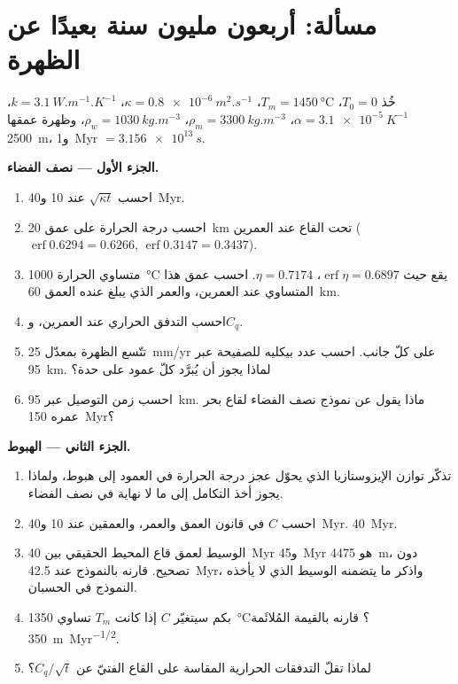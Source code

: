 \section{مسألة: أربعون مليون سنة بعيدًا عن الظهرة}

\begin{problem}
\label{pb:b3:lithosphere-thermal-models:1}
خُذ $T_0 = 0$، $T_m = \qty{1450}{\celsius}$، $\kappa =
\qty{0.8e-6}{m^2.s^{-1}}$، $k = \qty{3.1}{W.m^{-1}.K^{-1}}$، $\alpha =
\qty{3.1e-5}{K^{-1}}$، $\rho_m = \qty{3300}{kg.m^{-3}}$، $\rho_w =
\qty{1030}{kg.m^{-3}}$، وظهرة عمقها \qty{2500}{m}، و\qty{1}{Myr} $=
\qty{3.156e13}{s}$.

\medskip\noindent\textbf{الجزء الأول --- نصف الفضاء.}
\begin{enumerate}
  \item احسب $\sqrt{\kappa t}$ عند 10 و\qty{40}{Myr}.
  \item احسب درجة الحرارة على عمق \qty{20}{km} تحت القاع عند العمرين
        ($\operatorname{erf}0.6294 = 0.6266$, $\operatorname{erf}0.3147 =
        0.3437$).
  \item متساوي الحرارة \qty{1000}{\celsius} يقع حيث $\operatorname{erf}\eta =
        0.6897$، $\eta = 0.7174$. احسب عمق هذا المتساوي عند العمرين، والعمر
        الذي يبلغ عنده العمق \qty{60}{km}.
  \item احسب التدفق الحراري عند العمرين، و$C_q$.
  \item تتّسع الظهرة بمعدّل \qty{25}{mm/yr} على كلّ جانب. احسب عدد بيكليه
        للصفيحة عبر \qty{95}{km}. لماذا يجوز أن يُبرَّد كلّ عمود
        على حدة؟
  \item احسب زمن التوصيل عبر \qty{95}{km}. ماذا يقول عن
        نموذج نصف الفضاء لقاع بحر عمره \qty{150}{Myr}؟
\end{enumerate}

\medskip\noindent\textbf{الجزء الثاني --- الهبوط.}
\begin{enumerate}[resume]
  \item تذكّر توازن الإيزوستازيا الذي يحوّل عجز درجة الحرارة في العمود إلى هبوط،
        ولماذا يجوز أخذ التكامل إلى ما لا نهاية
        في نصف الفضاء.
  \item احسب $C$ في قانون العمق والعمر، والعمقين عند 10 و\qty{40}{Myr}.
        \qty{40}{Myr}.
  \item الوسيط لعمق قاع المحيط الحقيقي بين \qty{40}{Myr} و\qty{45}{Myr}
        هو \qty{4475}{m}، دون تصحيح. قارنه بالنموذج عند
        \qty{42.5}{Myr}، واذكر ما يتضمنه الوسيط الذي لا يأخذه
        النموذج في الحسبان.
  \item بكم سيتغيّر $C$ إذا كانت $T_m$ تساوي \qty{1350}{\celsius}؟
        قارنه بالقيمة المُلائَمة \qty{350}{m.Myr^{-1/2}}.
  \item لماذا تقلّ التدفقات الحرارية المقاسة على القاع الفتيّ عن $C_q/\sqrt t$؟
\end{enumerate}


\end{problem}
